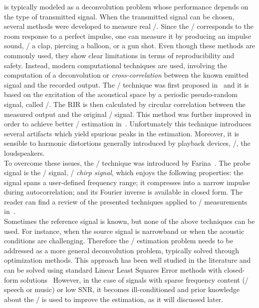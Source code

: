  is typically modeled as a deconvolution problem whose performance depends on the type of transmitted signal.
When the transmitted signal can be chosen, several methods were developed to measure real \RIRs/.
Since the \RIR/ corresponds to the room response to a perfect impulse, one can measure it by producing an impulse sound, \eg/ a clap, piercing a balloon, or a gun shot.
Even though these methods are commonly used, they show clear limitations in terms of reproducibility and safety.
Instead, modern computational techniques are used, involving the computation of a deconvolution or \textit{cross-correlation} between the known emitted signal and the recorded output.
The \MLSdef/ technique was first proposed in~ and it is based on the excitation of the acoustical space by a periodic pseudo-random signal, called \MLS/.
The RIR is then calculated by circular correlation between the measured output and the original \MLS/ signal.
This method was further improved in order to achieve better \RIR/ estimation in~.
Unfortunately this technique introduces several artifacts which yield spurious peaks in the estimation.
Moreover, it is sensible to harmonic distortions generally introduced by playback devices, \eg/, the loudspeakers.
\\To overcome these issues, the \ESSdef/ technique was introduced by Farina~.
The probe signal is the \ESS/ signal, \aka/ \textit{chirp signal}, which enjoys the following properties:
the signal spans a user-defined frequency range; it compresses into a narrow impulse during autocorrelation; and its Fourier inverse is available in closed form.
The reader can find a review of the presented techniques applied to \RIR/ measurements in~.
\\Sometimes the reference signal is known, but none of the above techniques can be used.
For instance, when the source signal is narrowband or when the acoustic conditions are challenging.
Therefore the \RIR/ estimation problem needs to be addressed as a more general deconvolution problem, typically solved through optimization methods.
This approach has been well studied in the literature and can be solved using standard Linear Least Squares Error methods with closed-form solutions~
However, in the case of signals with sparse frequency content (\eg/ speech or music) or low SNR, it becomes ill-conditioned and prior knowledge about the \RIR/ is used to improve the estimation, as it will discussed later.

